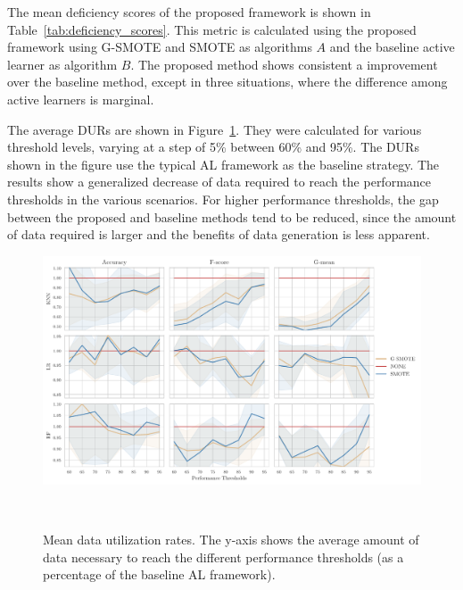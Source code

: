 \documentclass[parskip=full]{scrartcl}
\begin{document}
The mean deficiency scores of the proposed framework is shown in
Table~\ref{tab:deficiency_scores}. This metric is calculated using the proposed
framework using G-SMOTE and SMOTE as algorithms $A$ and the baseline active
learner as algorithm $B$. The proposed method shows consistent a improvement
over the baseline method, except in three situations, where the difference
among active learners is marginal.


The average DURs are shown in Figure~\ref{fig:dur}. They were calculated for
various threshold levels, varying at a step of 5\% between 60\% and 95\%. The
DURs shown in the figure use the typical AL framework as the baseline strategy.
The results show a generalized decrease of data required to reach the
performance thresholds in the various scenarios. For higher performance
thresholds, the gap between the proposed and baseline methods tend to be
reduced, since the amount of data required is larger and the benefits of data
generation is less apparent.

\begin{figure}[H]
	\centering
	\includegraphics[width=1\linewidth]{../analysis/data_utilization_rate}
    \caption{Mean data utilization rates. The y-axis shows the average amount
    of data necessary to reach the different performance thresholds (as a
    percentage of the baseline AL framework).}~\label{fig:dur}
\end{figure}
\end{document}
